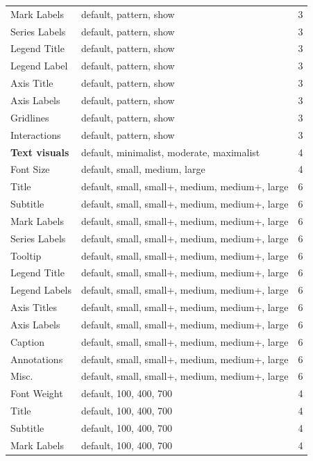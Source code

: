 \documentclass[12pt]{cmuthesis}
\begin{document}
{\begin{longtable}{@{}l p{7.2cm} r@{}}
\qquad Mark Labels & default, pattern, show & 3 \\
\qquad Series Labels & default, pattern, show & 3 \\
\qquad Legend Title & default, pattern, show & 3 \\
\qquad Legend Label & default, pattern, show & 3 \\
\qquad Axis Title & default, pattern, show & 3 \\
\qquad Axis Labels & default, pattern, show & 3 \\
\qquad Gridlines & default, pattern, show & 3 \\
\qquad Interactions & default, pattern, show & 3 \\
\addlinespace
\textbf{Text visuals} & default, minimalist, moderate, maximalist & 4 \\
\quad Font Size & default, small, medium, large & 4 \\
\qquad Title & default, small, small+, medium, medium+, large & 6 \\
\qquad Subtitle & default, small, small+, medium, medium+, large & 6 \\
\qquad Mark Labels & default, small, small+, medium, medium+, large & 6 \\
\qquad Series Labels & default, small, small+, medium, medium+, large & 6 \\
\qquad Tooltip & default, small, small+, medium, medium+, large & 6 \\
\qquad Legend Title & default, small, small+, medium, medium+, large & 6 \\
\qquad Legend Labels & default, small, small+, medium, medium+, large & 6 \\
\qquad Axis Titles & default, small, small+, medium, medium+, large & 6 \\
\qquad Axis Labels & default, small, small+, medium, medium+, large & 6 \\
\qquad Caption & default, small, small+, medium, medium+, large & 6 \\
\qquad Annotations & default, small, small+, medium, medium+, large & 6 \\
\qquad Misc. & default, small, small+, medium, medium+, large & 6 \\
\quad Font Weight & default, 100, 400, 700 & 4 \\
\qquad Title & default, 100, 400, 700 & 4 \\
\qquad Subtitle & default, 100, 400, 700 & 4 \\
\qquad Mark Labels & default, 100, 400, 700 & 4 \\

\end{longtable}}
\end{document}
